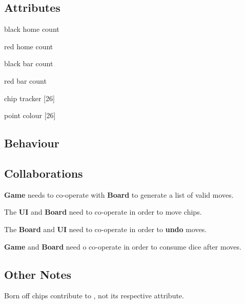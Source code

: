\begin{multicols}{2}
    \begin{dashed}
        \subsection{Attributes}
        \item black home count
        \item red home count
        \item black bar count
        \item red bar count
        \item chip tracker [26]
        \item point colour [26]
    \end{dashed}

    \begin{dashed}
        \subsection{Behaviour}
        \item {}
        \item {}
        \item {}
        \item {}
        \item {}
    \end{dashed}
\end{multicols}

\subsection{Collaborations}
\begin{dashed}
    \item \textbf{Game} needs to co-operate with \textbf{Board} to generate a list of valid moves.
    \item The \textbf{UI} and \textbf{Board} need to co-operate in order to move chips.
    \item The \textbf{Board} and \textbf{UI} need to co-operate in order to \textbf{undo} moves.
    \item \textbf{Game} and \textbf{Board} need o co-operate in order to consume dice after moves.
\end{dashed}

\subsection{Other Notes}
\begin{dashed}
    \item Born off chips contribute to , not its respective attribute.
\end{dashed}
